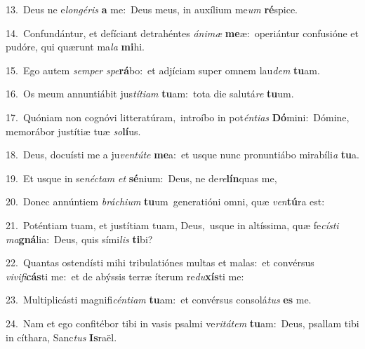 {\numbfont\textcolor{\numbcolor}{13.}}~Deus ne e\-\textit{lon}\-\textit{gé}\textit{ris} \textbf{a} me:~\star Deus meus, in auxílium me\textit{um} \textbf{ré}\-spice.\par
{\numbfont\textcolor{\numbcolor}{14.}}~Confundántur, et defíciant detrahéntes \textit{á}\-\textit{ni}\textit{mæ} \textbf{me}\-æ:~\star operiántur confusióne et pudóre, qui quærunt ma\textit{la} \textbf{mi}\-hi.\par
{\numbfont\textcolor{\numbcolor}{15.}}~Ego autem \textit{sem}\-\textit{per} \textit{spe}\-\textbf{rá}bo:~\star et adjíciam super omnem lau\textit{dem} \textbf{tu}\-am.\par
{\numbfont\textcolor{\numbcolor}{16.}}~Os meum annuntiábit jus\-\textit{tí}\-\textit{ti}\textit{am} \textbf{tu}\-am:~\star tota die salutá\textit{re} \textbf{tu}\-um.\par
{\numbfont\textcolor{\numbcolor}{17.}}~Quóniam non cognóvi litteratúram,~\dagger introíbo in pot\-\textit{én}\-\textit{ti}\textit{as} \textbf{Dó}\-mini:~\star Dómine, memorábor justítiæ tuæ \textit{so}\-\textbf{lí}us.\par
{\numbfont\textcolor{\numbcolor}{18.}}~Deus, docuísti me a ju\-\textit{ven}\-\textit{tú}\textit{te} \textbf{me}\-a:~\star et usque nunc pronuntiábo mirabíli\textit{a} \textbf{tu}\-a.\par
{\numbfont\textcolor{\numbcolor}{19.}}~Et usque in se\-\textit{néc}\-\textit{tam} \textit{et} \textbf{sé}\-nium:~\star Deus, ne de\-\textit{re}\-\textbf{lín}quas me,\par
{\numbfont\textcolor{\numbcolor}{20.}}~Donec annúntiem \textit{brá}\-\textit{chi}\textit{um} \textbf{tu}\-um~\star generatióni omni, quæ \textit{ven}\-\textbf{tú}ra est:\par
{\numbfont\textcolor{\numbcolor}{21.}}~Poténtiam tuam, et justítiam tuam, Deus,~\dagger usque in altíssima, quæ fe\-\textit{cís}\-\textit{ti} \textit{ma}\-\textbf{gná}lia:~\star Deus, quis sími\textit{lis} \textbf{ti}\-bi?\par
{\numbfont\textcolor{\numbcolor}{22.}}~Quantas ostendísti mihi tribulatiónes multas et malas:~\dagger et convérsus \textit{vi}\-\textit{vi}\textit{fi}\textbf{cás}ti me:~\star et de abýssis terræ íterum re\-\textit{du}\-\textbf{xís}ti me:\par
{\numbfont\textcolor{\numbcolor}{23.}}~Multiplicásti magnifi\-\textit{cén}\-\textit{ti}\textit{am} \textbf{tu}\-am:~\star et convérsus consolá\textit{tus} \textbf{es} me.\par
{\numbfont\textcolor{\numbcolor}{24.}}~Nam et ego confitébor tibi in vasis psalmi ve\-\textit{ri}\-\textit{tá}\textit{tem} \textbf{tu}\-am:~\star Deus, psallam tibi in cíthara, Sanc\textit{tus} \textbf{Is}\-raël.\par
